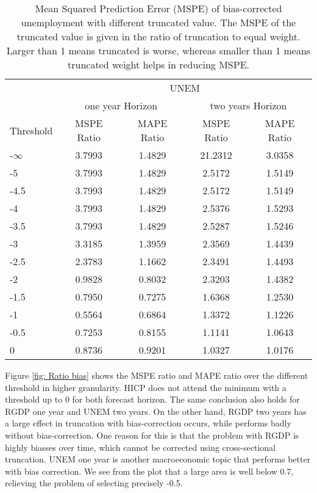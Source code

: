 \documentclass[11pt]{article}
\begin{document}
\begin{table}[!h]
	\centering
	\caption{Mean Squared Prediction Error (MSPE) of bias-corrected unemployment with different truncated value. The MSPE of the truncated value is given in the ratio of truncation to equal weight. Larger than 1 means truncated is worse, whereas smaller than 1 means truncated weight helps in reducing MSPE.}
	\label{tab: MSPE UNEM bias}
	\begin{tabular}{lcccc}
		\hline
		&                        \multicolumn{4}{c}{UNEM}                         \\
		\cmidrule(lr){2-5}                              & \multicolumn{2}{c}{one year Horizon} & \multicolumn{2}{c}{two years Horizon} \\
		\cmidrule(lr){2-3} \cmidrule(lr){4-5}
		Threshold & MSPE Ratio & MAPE Ratio  & MSPE Ratio & MAPE Ratio  \\ \hline
		-$\infty$ & 3.7993 & 1.4829 & 21.2312 & 3.0358\\ 
		-5 & 3.7993 & 1.4829 & 2.5172 & 1.5149\\ 
		-4.5 & 3.7993 & 1.4829 & 2.5172 & 1.5149\\ 
		-4 & 3.7993 & 1.4829 & 2.5376 & 1.5293\\ 
		-3.5 & 3.7993 & 1.4829 & 2.5287 & 1.5246\\ 
		-3 & 3.3185 & 1.3959 & 2.3569 & 1.4439\\ 
		-2.5 & 2.3783 & 1.1662 & 2.3491 & 1.4493\\ 
		-2 & 0.9828 & 0.8032 & 2.3203 & 1.4382\\ 
		-1.5 & 0.7950 & 0.7275 & 1.6368 & 1.2530\\ 
		-1 & 0.5564 & 0.6864 & 1.3372 & 1.1226\\ 
		-0.5 & 0.7253 & 0.8155 & 1.1141 & 1.0643\\ 
		0 & 0.8736 & 0.9201 & 1.0327 & 1.0176\\ \hline
	\end{tabular}
\end{table}

Figure \ref{fig: Ratio bias} shows the MSPE ratio and MAPE ratio over the different threshold in higher granularity. HICP does not attend the minimum with a threshold up to 0 for both forecast horizon. The same conclusion also holds for RGDP one year and UNEM two years. On the other hand, RGDP two years has a large effect in truncation with bias-correction occurs, while performs badly without bias-correction. One reason for this is that the problem with RGDP is highly biasses over time, which cannot be corrected using cross-sectional truncation. UNEM one year is another macroeconomic topic that performs better with bias correction. We see from the plot that a large area is well below 0.7, relieving the problem of selecting precisely -0.5.
\end{document}
